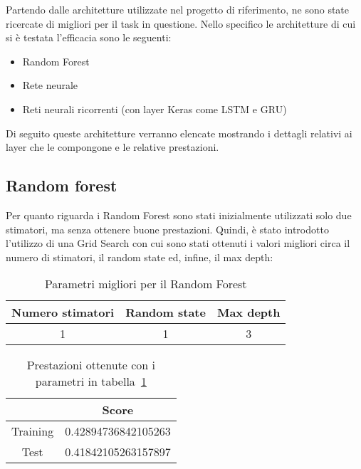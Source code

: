 Partendo dalle architetture utilizzate nel progetto di riferimento, ne sono state ricercate di migliori per il task in questione. Nello specifico le architetture di cui si è testata l'efficacia sono le seguenti: 

\begin{itemize}
    \item Random Forest
    \item Rete neurale
    \item Reti neurali ricorrenti (con layer Keras come LSTM e GRU)
\end{itemize}

Di seguito queste architetture verranno elencate mostrando i dettagli relativi ai layer che le compongone e le relative prestazioni.

\subsection{Random forest}
Per quanto riguarda i Random Forest sono stati inizialmente utilizzati solo due stimatori, ma senza ottenere buone prestazioni. Quindi, è stato introdotto l'utilizzo di una Grid Search con cui sono stati ottenuti i valori migliori circa il numero di stimatori, il random state ed, infine, il max depth:

\begin{table}[h]
    \centering
    \begin{tabular}{|c|c|c|}
    \hline
         Numero stimatori & Random state & Max depth\\
    \hline
        1 & 1 & 3 \\
    \hline
    \end{tabular}
    \caption{Parametri migliori per il Random Forest}
    \label{tab:rdmF_bestParams}
\end{table}

\begin{table}[h]
    \centering
    \begin{tabular}{|c|c|}
    \hline
         & Score \\
         \hline
         Training & 0.42894736842105263 \\
         \hline
         Test & 0.41842105263157897 \\
    \hline
    \end{tabular}
    \caption{Prestazioni ottenute con i parametri in tabella~\ref{tab:rdmF_bestParams}}
    \label{tab:my_label}
\end{table}

\newpage
